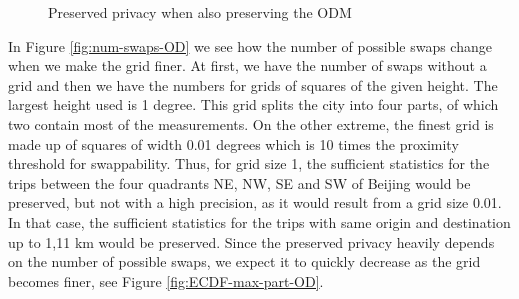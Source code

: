 \documentclass[times,twocolumn,final,authoryear]{elsarticle}
\begin{document}
\begin{figure}
\centering
  \caption{Preserved privacy when also preserving the ODM}
  \label{fig:OD}
\end{figure}

In Figure \ref{fig:num-swaps-OD} we see how the number of possible
swaps change when we make the grid finer. At first, we have the number
of swaps without a grid and then we have the numbers for grids of
squares of the given height. The largest height used is 1 degree.
This grid splits the city into four parts, of which two contain
most of the measurements. On the other extreme, the finest grid is made up of squares of width 0.01 degrees which is 10 times the proximity threshold for swappability.  
{\color{blue} 
Thus, for grid size 1, the sufficient statistics for the trips between the four quadrants NE, NW, SE and SW of Beijing would be preserved, but not with a high precision, as it would result from a grid size 0.01. In that case, the sufficient statistics for the trips with same origin and destination up to 1,11 km would be preserved.
} Since the preserved privacy heavily depends on the number of possible
swaps, we expect it to quickly decrease as the grid becomes finer, see Figure
\ref{fig:ECDF-max-part-OD}. 
\end{document}
